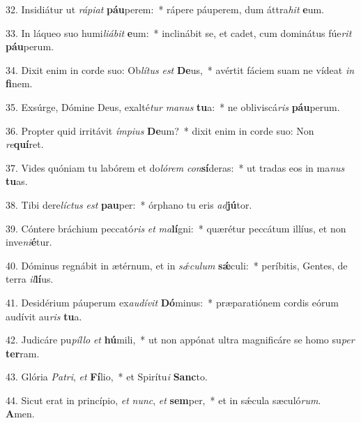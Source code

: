 32. Insidiátur ut \textit{rá}\textit{pi}\textit{at} \textbf{páu}perem:~*  rápere páuperem, dum áttra\textit{hit} \textbf{e}um.\

33. In láqueo suo humi\textit{li}\textit{á}\textit{bit} \textbf{e}um:~*  inclinábit se, et cadet, cum dominátus fúe\textit{rit} \textbf{páu}perum.\

34. Dixit enim in corde suo: Ob\textit{lí}\textit{tus} \textit{est} \textbf{De}us,~*  avértit fáciem suam ne vídeat \textit{in} \textbf{fi}nem.\

35. Exsúrge, Dómine Deus, exalté\textit{tur} \textit{ma}\textit{nus} \textbf{tu}a:~*  ne obliviscá\textit{ris} \textbf{páu}perum.\

36. Propter quid irritávit \textit{ím}\textit{pi}\textit{us} \textbf{De}um?~*  dixit enim in corde suo: Non \textit{re}\textbf{quí}ret.\

37. Vides quóniam tu labórem et do\textit{ló}\textit{rem} \textit{con}\textbf{sí}deras:~*  ut tradas eos in ma\textit{nus} \textbf{tu}as.\

38. Tibi dere\textit{líc}\textit{tus} \textit{est} \textbf{pau}per:~*  órphano tu eris \textit{ad}\textbf{jú}tor.\

39. Cóntere bráchium peccató\textit{ris} \textit{et} \textit{ma}\textbf{lí}gni:~*  quærétur peccátum illíus, et non inve\textit{ni}\textbf{é}tur.\

40. Dóminus regnábit in ætérnum, et in \textit{sǽ}\textit{cu}\textit{lum} \textbf{sǽ}culi:~*  períbitis, Gentes, de terra \textit{il}\textbf{lí}us.\

41. Desidérium páuperum ex\textit{au}\textit{dí}\textit{vit} \textbf{Dó}minus:~*  præparatiónem cordis eórum audívit au\textit{ris} \textbf{tu}a.\

42. Judicáre pu\textit{píl}\textit{lo} \textit{et} \textbf{hú}mili,~*  ut non appónat ultra magnificáre se homo su\textit{per} \textbf{ter}ram.\

43. Glória \textit{Pa}\textit{tri}, \textit{et} \textbf{Fí}lio,~*  et Spirítu\textit{i} \textbf{Sanc}to.\

44. Sicut erat in princípio, \textit{et} \textit{nunc}, \textit{et} \textbf{sem}per,~*  et in sǽcula sæculó\textit{rum}. \textbf{A}men.\

